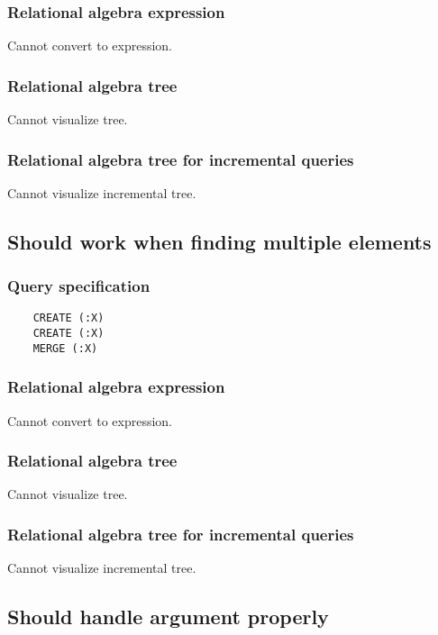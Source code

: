 	\subsubsection*{Relational algebra expression}

	Cannot convert to expression.

	\subsubsection*{Relational algebra tree}

	Cannot visualize tree.

	\subsubsection*{Relational algebra tree for incremental queries}

	Cannot visualize incremental tree.
	\subsection{Should work when finding multiple elements}

	\subsubsection*{Query specification}

	\begin{lstlisting}
	CREATE (:X)
	CREATE (:X)
	MERGE (:X)
	\end{lstlisting}


	\subsubsection*{Relational algebra expression}

	Cannot convert to expression.

	\subsubsection*{Relational algebra tree}

	Cannot visualize tree.

	\subsubsection*{Relational algebra tree for incremental queries}

	Cannot visualize incremental tree.
	\subsection{Should handle argument properly}

